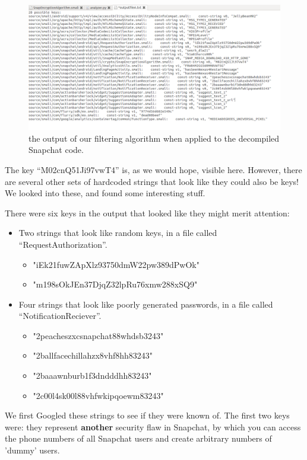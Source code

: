 \documentclass[11pt]{article}
\numberwithin{theorem}{subsection}
\begin{document}
\begin{figure}[H]
  \caption{the output of our filtering algorithm when applied to the decompiled Snapchat code.}
  \centering
  \includegraphics[scale=0.4]{image3.png}
\end{figure}

The key ``M02cnQ51Ji97vwT4'' is, as we would hope, visible here.  However, there are several other sets of
hardcoded strings that look like they could also be keys!  We looked into these, and found some interesting stuff.

There were six keys in the output that looked like they might merit attention:

\begin{itemize}
\item Two strings that look like random keys, in a file called ``RequestAuthorization''. 
\begin{itemize}
\item "iEk21fuwZApXlz93750dmW22pw389dPwOk"
\item "m198sOkJEn37DjqZ32lpRu76xmw288xSQ9"
\end{itemize}
\item Four strings that look like poorly generated passwords, in a file called ``NotificationReciever''.
\begin{itemize}
\item "2peacheszxcsnapchat88whdsb3243"
\item "2ballfacechillahzx8vhf8hh83243"
\item "2baaawnburb1f3dndddhh83243"
\item "2c00l4sk00l88vhfwkipqoewm83243"
\end{itemize}
\end{itemize}

We first Googled these strings to see if they were known of.  The first two keys were: they represent \textbf{another} security
flaw in Snapchat, by which you can access the phone numbers of all Snapchat users and create arbitrary numbers of 'dummy' users.\cite{snapchatFlaw2}
\end{document}
